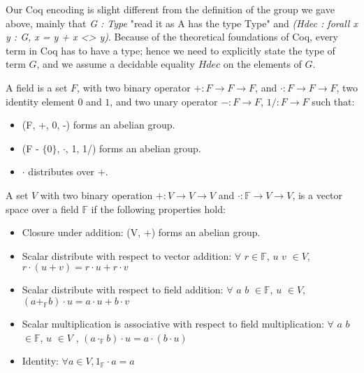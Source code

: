 \noindent
Our Coq encoding is slight different from the definition of the group we gave above, mainly that \textit{G : Type} "read it as A has the type Type" and 
\textit{(Hdec : forall x y : G, {x = y} + {x <> y})}. Because of the theoretical foundations of Coq, every term in Coq has to have a type;
hence we need to explicitly state the type of term $G$, and we assume a decidable equality $Hdec$ on the elements of $G$.  

\begin{definition}[Field] 
A field  is a set $F$, with two binary operator $+ : F \rightarrow F \rightarrow F$,  and $\cdot : F \rightarrow F \rightarrow F$, 
two identity element $0$ and $1$, and two unary operator $- : F \rightarrow F$, $1/ : F \rightarrow F$  such that:
\end{definition} 
 \begin{itemize}
 \item (F, +, 0, -) forms an abelian group.
 \item (F - $\lbrace 0 \rbrace$, $\cdot$, 1, 1/) forms an abelian group.
 \item $\cdot$ distributes over +.
 \end{itemize}
 
 

\begin{definition}
A set $V$ with two binary operation $+ : V \rightarrow V \rightarrow V$ and $\cdot : \mathbb{F}  \rightarrow V \rightarrow V$, 
is  a vector space over a field $\mathbb{F}$ if the following properties hold:
\end{definition} 
\begin{itemize}
 \item Closure under addition: (V, +) forms an abelian group. 
 \item Scalar  distribute  with respect  to  vector  addition: $\forall$  $r \in \mathbb{F}$, $u$ $v$ $\in V$,  $r \cdot (u + v) = r \cdot u + r \cdot v$
 \item Scalar distribute with respect to field addition: 
                $\forall$  $a$ $b$ $\in \mathbb{F}$, $u$ $\in V$, $(a +_{\mathbb{F}} b) \cdot u = a \cdot u + b \cdot v$
  \item Scalar multiplication is associative with respect to field multiplication:
         $\forall$ $a$ $b$ $\in  \mathbb{F}$, $u$ $\in V$ , $(a \cdot_{\mathbb{F}} b) \cdot u = a \cdot (b \cdot u)$
  \item Identity: $\forall a \in V, 1_{\mathbb{F}} \cdot a = a$

\end{itemize}



